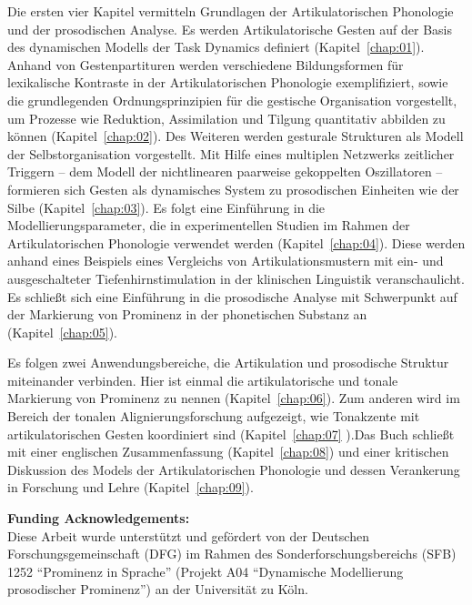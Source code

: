 Die ersten vier Kapitel vermitteln Grundlagen der Artikulatorischen Phonologie und der prosodischen Analyse. Es werden Artikulatorische Gesten auf der Basis des dynamischen Modells der Task Dynamics definiert (Kapitel~\ref{chap:01}). Anhand von Gestenpartituren werden verschiedene Bildungsformen für lexikalische Kontraste in der Artikulatorischen Phonologie exemplifiziert, sowie die grundlegenden Ordnungsprinzipien für die gestische Organisation vorgestellt, um Prozesse wie Reduktion, Assimilation und Tilgung quantitativ abbilden zu können (Kapitel~\ref{chap:02}). Des Weiteren werden gesturale Strukturen als Modell der Selbstorganisation vorgestellt. Mit Hilfe eines multiplen Netzwerks zeitlicher Triggern -- dem Modell der nichtlinearen paarweise gekoppelten Oszillatoren -- formieren sich Gesten als dynamisches System zu prosodischen Einheiten wie der Silbe (Kapitel~\ref{chap:03}). Es folgt eine Einführung in die Modellierungsparameter, die in experimentellen Studien im Rahmen der Artikulatorischen Phonologie verwendet werden (Kapitel~\ref{chap:04}). Diese werden anhand eines Beispiels eines Vergleichs von Artikulationsmustern mit ein- und ausgeschalteter Tiefenhirnstimulation in der klinischen Linguistik veranschaulicht. Es schließt sich eine Einführung in die prosodische Analyse mit Schwerpunkt auf der Markierung von Prominenz in der phonetischen Substanz an (Kapitel~\ref{chap:05}).

Es folgen zwei Anwendungsbereiche, die Artikulation und prosodische Struktur miteinander verbinden. Hier ist einmal die artikulatorische und tonale Markierung von Prominenz zu nennen (Kapitel~\ref{chap:06}). Zum anderen wird im Bereich der tonalen Alignierungsforschung aufgezeigt, wie Tonakzente mit artikulatorischen Gesten koordiniert sind (Kapitel~\ref{chap:07} ).Das Buch schließt mit einer englischen Zusammenfassung (Kapitel~\ref{chap:08}) und einer kritischen Diskussion des Models der Artikulatorischen Phonologie und dessen Verankerung in Forschung und Lehre (Kapitel~\ref{chap:09}).

\vspace*{2em}
\noindent \textbf{Funding Acknowledgements:}\\%
Diese Arbeit wurde unterstützt und gefördert von der Deutschen Forschungsgemeinschaft (DFG) im Rahmen des Sonderforschungsbereichs (SFB) 1252 \enquote{Prominenz in Sprache} (Projekt A04 \enquote{Dynamische Modellierung prosodischer Prominenz}) an der Universität zu Köln.